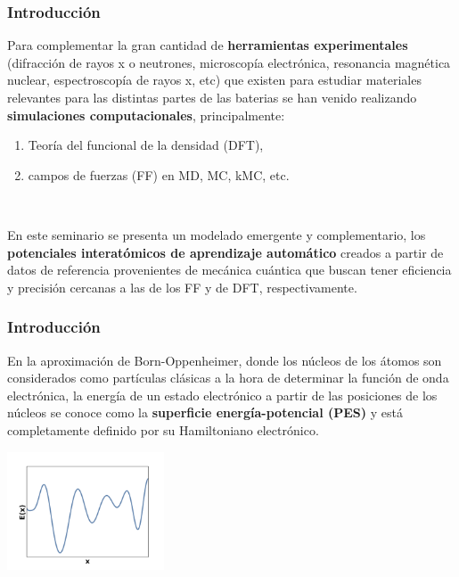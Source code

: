 \documentclass[aspectratio=169]{beamer}
\let\oldtextbf\textbf
\renewcommand{\textbf}[1]{\textcolor{nordblue}{\oldtextbf{#1}}}
\begin{document}
    \begin{frame}
        \frametitle{Introducción}
        
        Para complementar la gran cantidad de \textbf{herramientas experimentales}
        (difracción de rayos x o neutrones, microscopía electrónica, resonancia
        magnética nuclear, espectroscopía de rayos x, etc) que existen para 
        estudiar materiales relevantes para las distintas partes de las baterias 
        se han venido realizando \textbf{simulaciones computacionales}, 
        principalmente:
        \begin{enumerate}
            \item Teoría del funcional de la densidad (DFT),
            \item campos de fuerzas (FF) en MD, MC, kMC, etc.
        \end{enumerate}

        \ \pause

        En este seminario se presenta un modelado emergente y complementario, los
        \textbf{potenciales interatómicos de aprendizaje automático} creados a 
        partir de datos de referencia provenientes de mecánica cuántica que buscan
        tener eficiencia y precisión cercanas a las de los FF y de DFT, 
        respectivamente.

	\end{frame}

    \begin{frame}
        \frametitle{Introducción}

        En la aproximación de Born-Oppenheimer, donde los núcleos de los átomos
        son considerados como partículas clásicas a la hora de determinar la 
        función de onda electrónica, la energía de un estado electrónico a partir 
        de las posiciones de los núcleos se conoce como la \textbf{superficie 
        energía-potencial (PES)} y está completamente definido por su Hamiltoniano
        electrónico.

        \pause

        \begin{center}
            \includegraphics[width=0.35\textwidth]{intro-pes.png}
        \end{center}

	\end{frame}
\end{document}
